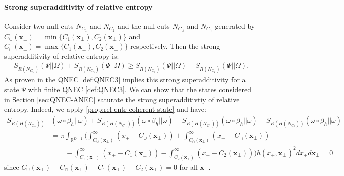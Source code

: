 \documentclass[12pt]{article}
\def\RR{{\mathbb R}}
\def\tx{\pmb{x}}
\theoremstyle{remark}
\begin{document}
\paragraph{Strong superadditivity of relative entropy}

Consider two null-cuts $N_{C_1}$ and $N_{C_2}$ and the null-cuts $N_{C_\cup}$ and $N_{C_\cap}$ generated by $C_\cup(\tx_\perp)=\min\{C_1(\tx_\perp),C_2(\tx_\perp)\}$ and $C_\cap(\tx_\perp)=\max\{C_1(\tx_\perp),C_2(\tx_\perp)\}$ respectively. 
Then the strong superadditivity of relative entropy is: 
	\begin{align*}
		S_{R(N_{C_\cup})}(\Psi||\Omega) + S_{R(N_{C_\cap})}(\Psi||\Omega) 	\geq S_{R(N_{C_1})}(\Psi||\Omega) + S_{R(N_{C_2})}(\Psi||\Omega).
	\end{align*}
As proven in \cite[Section 3.2]{CF18} the QNEC \eqref{def:QNEC3} implies this strong superadditivity
for a state $\Psi$ with finite QNEC \eqref{def:QNEC3}.
We can show that the states considered in Section \ref{sec:QNEC-ANEC} saturate the strong superadditivtiy of relative entropy.
Indeed, we apply \autoref{prop:rel-entr-coherent-state} and have:
	\begin{align*}
			S_{R(H(N_{C_\cup}))}&(\omega \circ \beta_h||\omega)+S_{R(H(N_{C_\cap}))}(\omega \circ \beta_h||\omega)-S_{R(H(N_{C_1}))}(\omega \circ \beta_h||\omega)-S_{R(H(N_{C_2}))}(\omega \circ \beta_h||\omega)\\
			&=\pi \int_{\RR^{D-1}}\Big(\int_{C_\cup(\tx_\perp)}^\infty (x_+-C_\cup(\tx_\perp)) +\int_{C_\cap(\tx_\perp)}^\infty (x_+-C_\cap(\tx_\perp))\\
			&\qquad-\int_{C_1(\tx_\perp)}^\infty (x_+-C_1(\tx_\perp))-\int_{C_2(\tx_\perp)}^\infty (x_+-C_2(\tx_\perp)) \Big)  h(x_+,\tx_\perp)^2 dx_+ d\tx_\perp=0
	\end{align*}
since $C_\cup(\tx_\perp)+C_\cap(\tx_\perp)-C_1(\tx_\perp)-C_2(\tx_\perp)=0$ for all $\tx_\perp$.
\end{document}
